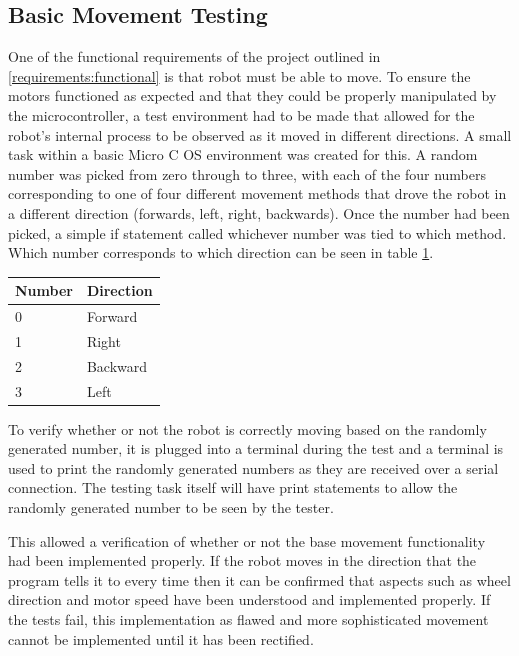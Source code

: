 			\subsection{Basic Movement Testing}
			One of the functional requirements of the project outlined in \ref{requirements:functional} is that robot must be able to move. To ensure the motors functioned as expected and that they could be properly manipulated by the microcontroller, a test environment had to be made that allowed for the robot's internal process to be observed as it moved in different directions. A small task within a basic Micro C OS environment was created for this. A random number was picked from zero through to three, with each of the four numbers corresponding to one of four different movement methods that drove the robot in a different direction (forwards, left, right, backwards). Once the number had been picked, a simple if statement called whichever number was tied to which method. Which number corresponds to which direction can be seen in table \ref{table:movementtestkey}.
			
			\begin{table}[h!]
				\centering
				\begin{tabular}{| l | l |} 
					\hline
					Number & Direction \\ [0.5ex] 
					\hline
					0 & Forward \\ 
					1 & Right \\
					2 & Backward \\
					3 & Left \\ [1ex] 
					\hline
				\end{tabular}
				\label{table:movementtestkey}		
			\end{table}
			
			To verify whether or not the robot is correctly moving based on the randomly generated number, it is plugged into a terminal during the test and a terminal is used to print the randomly generated numbers as they are received over a serial connection. The testing task itself will have print statements to allow the randomly generated number to be seen by the tester.

			This allowed a verification of whether or not the base movement functionality had been implemented properly. If the robot moves in the direction that the program tells it to every time then it can be confirmed that aspects such as wheel direction and motor speed have been understood and implemented properly. If the tests fail, this implementation as flawed and more sophisticated movement cannot be implemented until it has been rectified.

